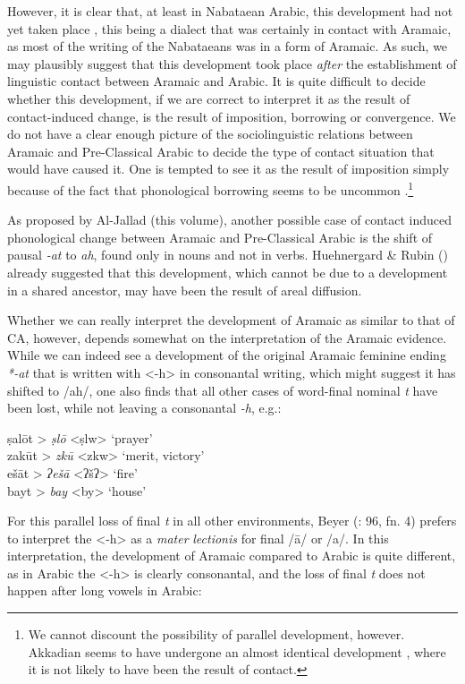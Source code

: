 \documentclass[output=paper]{langsci/langscibook}
\begin{document}
However, it is clear that, at least in Nabataean Arabic, this development had not yet taken place \citep[91--93]{Diem1980}, this being a dialect that was certainly in contact with Aramaic, as most of the writing of the Nabataeans was in a form of Aramaic. As such, we may plausibly suggest that this development took place \textit{after} the establishment of linguistic contact between Aramaic and Arabic. It is quite difficult to decide whether this development, if we are correct to interpret it as the result of contact-induced change, is the result of imposition, borrowing or convergence. We do not have a clear enough picture of the sociolinguistic relations between Aramaic and Pre-Classical Arabic to decide the type of contact situation that would have caused it. One is tempted to see it as the result of imposition simply because of the fact that phonological borrowing seems to be uncommon \citep[526]{Lucas2015}.\footnote{We cannot discount the possibility of parallel development, however. Akkadian seems to have undergone an almost identical development \citep[196]{Huehnergard1997}, where it is not likely to have been the result of contact.} 

As proposed by Al-Jallad (this volume), another possible case of contact induced phonological change between Aramaic and Pre-Classical Arabic is the shift of pausal \textit{-at} to \textit{ah}, found only in nouns and not in verbs. Huehnergard \& Rubin (\citeyear[267--268]{HuehnergardRubin2011}) already suggested that this development, which cannot be due to a development in a shared ancestor, may have been the result of areal diffusion.

Whether we can really interpret the development of Aramaic as similar to that of CA, however, depends somewhat on the interpretation of the Aramaic evidence. While we can indeed see a development of the original Aramaic feminine ending \textit{*-at} that is written with <-h> in consonantal writing, which might suggest it has shifted to /ah/, one also finds that all other cases of word-final nominal \textit{t} have been lost, while not leaving a consonantal \textit{-h}, e.g.: 

\ea
\ea *ṣalōt > \textit{ṣlō} <ṣlw> ‘prayer’\\
\ex *zakūt > \textit{zkū} <zkw> ‘merit, victory’\\
\ex *ešāt > \textit{ʔešā} <ʔšʔ> ‘fire’\\
\ex *bayt > \textit{bay} <by> ‘house’
\z
\z

For this parallel loss of final \textit{t} in all other environments, Beyer (\citeyear{Beyer1984}: 96, fn. 4) prefers to interpret the <-h> as a \textit{mater} \textit{lectionis} for final /ā/ or /a/. In this interpretation, the development of Aramaic compared to Arabic is quite different, as in Arabic the <-h> is clearly consonantal, and the loss of final \textit{t} does not happen after long vowels in Arabic:
\end{document}
